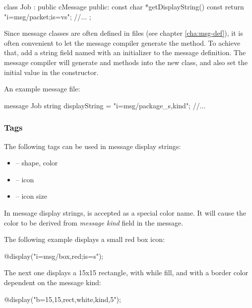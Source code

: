 \begin{cpp}
class Job : public cMessage
{
  public:
    const char *getDisplayString() const {return "i=msg/packet;is=vs";}
    //...
};
\end{cpp}

Since message classes are often defined in  files (see chapter
\ref{cha:msg-def}), it is often convenient to let the message compiler
generate the  method. To achieve that, add a
string field named  with an initializer to the message
definition. The message compiler will generate 
and  methods into the new class, and also set the
initial value in the constructor.

An example message file:

\begin{msg}
message Job
{
    string displayString = "i=msg/package_s,kind";
    //...
}
\end{msg}

\subsubsection{Tags}
\label{sec:graphics:message-displaystring-tags}

The following tags can be used in message display strings:

\begin{itemize}
  \item {} -- shape, color
  \item {} -- icon
  \item {} -- icon size
\end{itemize}

\begin{note}
   In message display strings,  is accepted as a special color name.
   It will cause the color to be derived from \textit{message kind} field in the message.
\end{note}

The following example displays a small red box icon:

\begin{ned}
@display("i=msg/box,red;is=s");
\end{ned}

The next one displays a 15x15 rectangle, with while fill, and with a border
color dependent on the message kind:

\begin{ned}
@display("b=15,15,rect,white,kind,5");
\end{ned}

